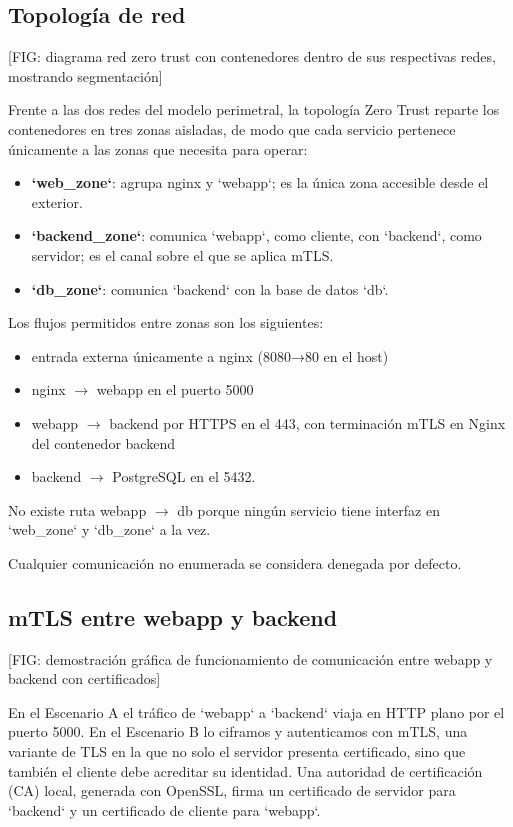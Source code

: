 \documentclass[11pt,spanish,listoffigures,listoftables]{tfgetsinf}
\begin{document}
        \subsection{Topología de red}
        [FIG: diagrama red zero trust con contenedores dentro de sus respectivas redes, mostrando segmentación]

        Frente a las dos redes del modelo perimetral, la topología Zero Trust reparte los contenedores en tres zonas aisladas, de modo que cada servicio pertenece únicamente a las zonas que necesita para operar:
        \begin{itemize}
            \item \textbf{`web\_zone`}: agrupa nginx y `webapp`; es la única zona accesible desde el exterior.
            \item \textbf{`backend\_zone`}: comunica `webapp`, como cliente, con `backend`, como servidor; es el canal sobre el que se aplica mTLS.
            \item \textbf{`db\_zone`}: comunica `backend` con la base de datos `db`.
        \end{itemize}

        Los flujos permitidos entre zonas son los siguientes:
        \begin{itemize}
            \item entrada externa únicamente a nginx (8080→80 en el host)
            \item nginx $\rightarrow$ webapp en el puerto 5000
            \item webapp $\rightarrow$ backend por HTTPS en el 443, con terminación mTLS en Nginx del contenedor backend
            \item backend $\rightarrow$ PostgreSQL en el 5432. 
        \end{itemize}
        No existe ruta webapp $\rightarrow$ db porque ningún servicio tiene interfaz en `web\_zone` y `db\_zone` a la vez.
        
        Cualquier comunicación no enumerada se considera denegada por defecto.
        
        \subsection{mTLS entre webapp y backend}
        [FIG: demostración gráfica de funcionamiento de comunicación entre webapp y backend con certificados]
        
        En el Escenario A el tráfico de `webapp` a `backend` viaja en HTTP plano por el puerto 5000. En el Escenario B lo ciframos y autenticamos con mTLS, una variante de TLS en la que no solo el servidor presenta certificado, sino que también el cliente debe acreditar su identidad. Una autoridad de certificación (CA) local, generada con OpenSSL, firma un certificado de servidor para `backend` y un certificado de cliente para `webapp`.
        
\end{document}
